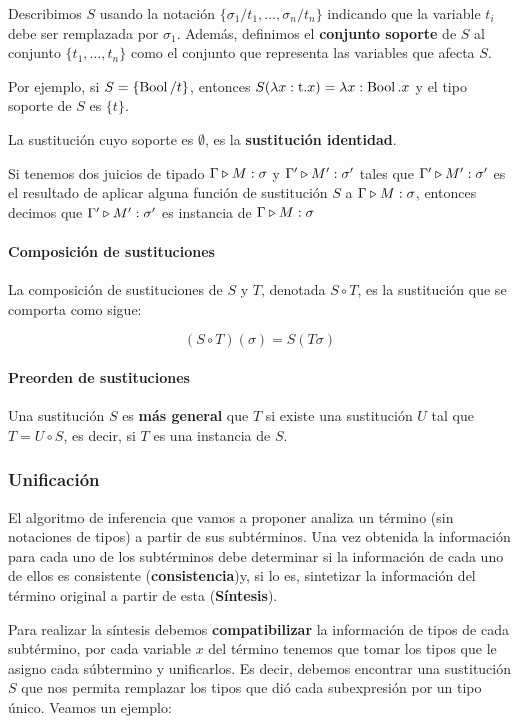 Describimos $S$ usando la notación $\{\sigma_1/t_1,\dots,\sigma_n/t_n\}$ indicando que la variable $t_i$ debe ser remplazada por $\sigma_1$. Además, definimos el \textbf{conjunto soporte} de $S$ al conjunto $\{t_1,\dots,t_n\}$ como el conjunto que representa las variables que afecta $S$.

Por ejemplo, si $S = \{ \operatorname{Bool}/t \}$, entonces $S(\lambda x: \text{t} . x) = \lambda x: \operatorname{Bool} . x$ y el tipo soporte de $S$ es $\{t\}$.

La sustitución cuyo soporte es $\emptyset$, es la \textbf{sustitución identidad}.


\hspace*{5mm}
Si tenemos dos juicios de tipado $\Gamma\triangleright M : \sigma$ y $\Gamma'\triangleright M' : \sigma'$ tales que $\Gamma'\triangleright M' : \sigma'$ es el resultado de aplicar alguna función de sustitución $S$ a $\Gamma\triangleright M : \sigma$, entonces decimos que $\Gamma'\triangleright M' : \sigma'$ es instancia de $\Gamma\triangleright M : \sigma$

\paragraph{Composición de sustituciones} La composición de sustituciones de $S$ y $T$, denotada $S\circ T$, es la sustitución que se comporta como sigue:

$$(S\circ T)(\sigma) = S(T\sigma)$$

\paragraph{Preorden de sustituciones} Una sustitución $S$ es \textbf{más general} que $T$ si existe una sustitución $U$ tal que $T = U\circ S$, es decir, si $T$ es una instancia de $S$.


\subsubsection{Unificación}
El algoritmo de inferencia que vamos a proponer analiza un término (sin notaciones de tipos) a partir de sus subtérminos. Una vez obtenida la información para cada uno de los subtérminos debe determinar si la información de cada uno de ellos es consistente (\textbf{consistencia})y, si lo es, sintetizar la información del término original a partir de esta (\textbf{Síntesis}).

Para realizar la síntesis debemos \textbf{compatibilizar} la información de tipos de cada subtérmino, por cada variable $x$ del término tenemos que tomar los tipos que le asigno cada súbtermino y unificarlos. Es decir, debemos encontrar una sustitución $S$ que nos permita remplazar los tipos que dió cada subexpresión por un tipo único. Veamos un ejemplo:

